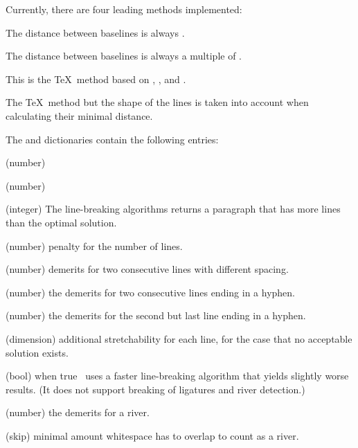 Currently, there are four leading methods implemented\?:
\begin{longdescription}
\item{}
  The distance between baselines is always .
\item{}
  The distance between baselines is always a multiple of .
\item{}
  This is the \TeX\ method based on , , and
  .
\item{}
  The \TeX\ method but the shape of the lines is taken into account when calculating their
  minimal distance.
\end{longdescription}

The  and  dictionaries contain the following entries\?:
\begin{longdescription}
\item{\quad (number)}
\item{\quad (number)}
\item{\quad (integer)}
  The line-breaking algorithms returns a paragraph that has 
  more lines than the optimal solution.
\item{\quad (number)}
  penalty for the number of lines.
\item{\quad (number)}
  demerits for two consecutive lines with different spacing.
\item{\quad (number)}
  the demerits for two consecutive lines ending in a hyphen.
\item{\quad (number)}
  the demerits for the second but last line ending in a hyphen.
\item{\quad (dimension)}
  additional stretchability for each line, for the case that no acceptable solution exists.
\item{\quad (bool)}
  when true \ant\ uses a faster line-breaking algorithm that yields slightly worse results.
  (It does not support breaking of ligatures and river detection.)
\item{\quad (number)}
  the demerits for a river.
\item{\quad (skip)}
  minimal amount whitespace has to overlap to count as a river.
\end{longdescription}
